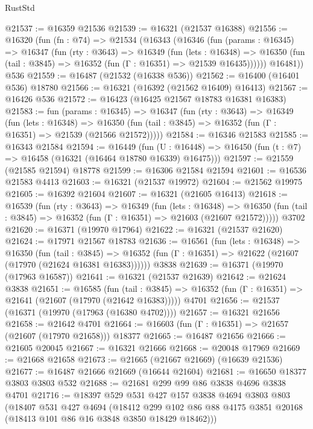 \begin{lexlean}{RustStd}
\begin{coremodule}
@21537 := @16359 @21536
@21539 := @16321 (@21537 @16388)
@21556 := @16320
    (fun (fn : @74) =>
    @21534
      (@16343
        (@16346
          (fun (params : @16345) =>
          @16347
            (fun (rty : @3643) =>
            @16349
              (fun (lets : @16348) =>
              @16350 (fun (tail : @3845) => @16352 (fun (Γ : @16351) => @21539 @16435))))))
        @16481))
    @536
@21559 := @16487 (@21532 (@16338 @536))
@21562 := @16400 (@16401 @536) @18780
@21566 := @16321 (@16392 (@21562 @16409) @16413)
@21567 := @16426 @536
@21572 := @16423 (@16425 @21567 @18783 @16381 @16383)
@21583 := fun (params : @16345) =>
  @16347
    (fun (rty : @3643) =>
    @16349
      (fun (lets : @16348) =>
      @16350 (fun (tail : @3845) => @16352 (fun (Γ : @16351) => @21539 (@21566 @21572)))))
@21584 := @16346 @21583
@21585 := @16343 @21584
@21594 := @16449
    (fun (U : @16448) => @16450 (fun (t : @7) => @16458 (@16321 (@16464 @18780 @16339) @16475)))
@21597 := @21559 (@21585 @21594) @18778
@21599 := @16306 @21584 @21594
@21601 := @16536 @21583 @4413
@21603 := @16321 (@21537 @19972)
@21604 := @21562 @19975
@21605 := @16392 @21604
@21607 := @16321 (@21605 @16413)
@21618 := @16539
    (fun (rty : @3643) =>
    @16349
      (fun (lets : @16348) =>
      @16350 (fun (tail : @3845) => @16352 (fun (Γ : @16351) => @21603 (@21607 @21572)))))
    @3702
@21620 := @16371 (@19970 @17964)
@21622 := @16321 (@21537 @21620)
@21624 := @17971 @21567 @18783
@21636 := @16561
    (fun (lets : @16348) =>
    @16350
      (fun (tail : @3845) =>
      @16352 (fun (Γ : @16351) => @21622 (@21607 (@17970 (@21624 @16381 @16383))))))
    @3838
@21639 := @16371 (@19970 (@17963 @16587))
@21641 := @16321 (@21537 @21639)
@21642 := @21624 @3838
@21651 := @16585
    (fun (tail : @3845) => @16352 (fun (Γ : @16351) => @21641 (@21607 (@17970 (@21642 @16383)))))
    @4701
@21656 := @21537 (@16371 (@19970 (@17963 (@16380 @4702))))
@21657 := @16321 @21656
@21658 := @21642 @4701
@21664 := @16603 (fun (Γ : @16351) => @21657 (@21607 (@17970 @21658))) @18377
@21665 := @16487 @21656
@21666 := @21605 @20045
@21667 := @16321 @21666
@21668 := @20048 @17969
@21669 := @21668 @21658
@21673 := @21665 (@21667 @21669) (@16639 @21536)
@21677 := @16487 @21666 @21669 (@16644 @21604)
@21681 := @16650 @18377 @3803 @3803 @532
@21688 := @21681 @299 @99 @86 @3838 @4696 @3838 @4701
@21716 := @18397
    @529
    @531
    @427
    @157
    @3838
    @4694
    @3803
    @803
    (@18407
      @531
      @427
      @4694
      (@18412 @299 @102 @86 @88 @4175 @3851 @20168 (@18413 @101 @86 @16 @3848 @3850 @18429 @18462)))

\end{coremodule}
\end{lexlean}
